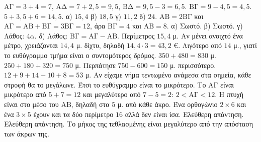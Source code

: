  $\mathrm{ΑΓ}=3+4=7$, $\mathrm{ΑΔ}=7+2{,}5=9{,}5$, $\mathrm{ΒΔ}=9{,}5-3=6{,}5$.
 $\mathrm{ΒΓ}=9-4{,}5=4{,}5$.
 $5+3{,}5+6=14{,}5$.
 α) $15{,}4$ \quad β) $18{,}5$ \quad γ) $11{,}2$ \quad δ) $24$.
 $\mathrm{ΑΒ}=2\mathrm{ΒΓ}$ και $\mathrm{ΑΓ}=\mathrm{ΑΒ}+\mathrm{ΒΓ}=3\mathrm{ΒΓ}=12$, άρα $\mathrm{ΒΓ}=4$ και $\mathrm{ΑΒ}=8$.
 α) Σωστό. β) Σωστό. γ) Λάθος: $4\alpha$. δ) Λάθος: $\mathrm{ΒΓ}=\mathrm{ΑΓ}-\mathrm{ΑΒ}$.
 Περίμετρος $15{,}4$ μ. Αν μένει ανοιχτό ένα μέτρο, χρειάζονται $14{,}4$ μ. δίχτυ, δηλαδή $14{,}4\cdot3=43{,}2$ €.
 Λιγότερο από $14$ μ., γιατί το ευθύγραμμο τμήμα είναι ο συντομότερος δρόμος.
 $350+480=830$ μ.
 $250+180+320=750$ μ. Περπάτησε $750-600=150$ μ. περισσότερο.
 $12+9+14+10+8=53$ μ.
 Αν είχαμε νήμα τεντωμένο ανάμεσα στα σημεία, κάθε στροφή θα το μεγάλωνε. Έτσι το ευθύγραμμο είναι το μικρότερο.
 Το $\mathrm{ΑΓ}$ είναι μικρότερο από $5+7=12$ και μεγαλύτερο από $7-5=2$: $2<\mathrm{ΑΓ}<12$.
 Η πτυχή είναι στο μέσο του $\mathrm{ΑΒ}$, δηλαδή στα $5$ μ. από κάθε άκρο.
 Ένα ορθογώνιο $2\times6$ και ένα $3\times5$ έχουν και τα δύο περίμετρο $16$ αλλά δεν είναι ίσα.
 Ελεύθερη απάντηση.
 Ελεύθερη απάντηση. Το μήκος της τεθλασμένης είναι μεγαλύτερο από την απόσταση των άκρων της.
